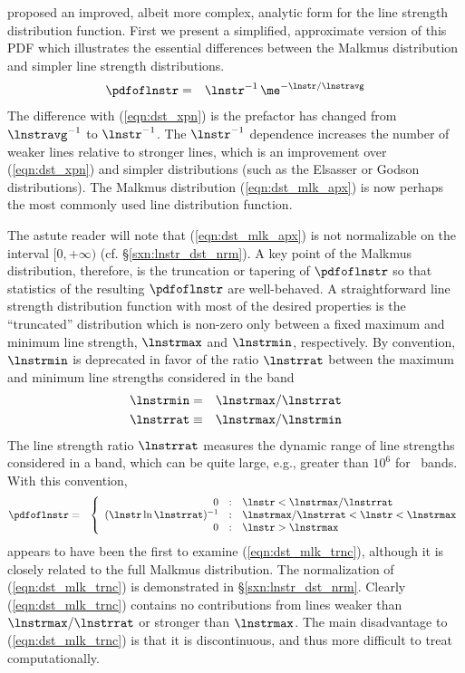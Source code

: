 \documentclass[12pt]{article}
\begin{document}
\cite{Mal67} proposed an improved, albeit more complex,
analytic form for the line strength distribution function.
First we present a simplified, approximate version of this PDF
which illustrates the essential differences between the Malkmus
distribution and simpler line strength distributions.
\begin{eqnarray}
\pdfoflnstr & = & \lnstr^{-1} \, \me^{-\lnstr/\lnstravg}
\label{eqn:dst_mlk_apx}
\end{eqnarray}
The difference with (\ref{eqn:dst_xpn}) is the prefactor has changed
from $\lnstravg^{-1}$ to $\lnstr^{-1}$.
The $\lnstr^{-1}$ dependence increases the number of weaker lines
relative to stronger lines, which is an improvement over
(\ref{eqn:dst_xpn}) and simpler distributions (such as the Elsasser or
Godson distributions). 
The Malkmus distribution (\ref{eqn:dst_mlk_apx}) is now perhaps the most
commonly used line distribution function. 

The astute reader will note that (\ref{eqn:dst_mlk_apx}) is not
normalizable on the interval $[0,+\infty)$
(cf. \S\ref{sxn:lnstr_dst_nrm}). 
A key point of the Malkmus distribution, therefore, is the
truncation or tapering of $\pdfoflnstr$ so that statistics of the
resulting $\pdfoflnstr$ are well-behaved.
A straightforward line strength distribution function with most
of the desired properties is the ``truncated'' distribution which is
non-zero only between a fixed maximum and minimum line strength, 
$\lnstrmax$ and $\lnstrmin$, respectively.
By convention, $\lnstrmin$ is deprecated in favor of the ratio
$\lnstrrat$ between the maximum and minimum line strengths considered
in the band  
\begin{eqnarray}
\lnstrmin & = & \lnstrmax / \lnstrrat \nonumber \\
\lnstrrat & \equiv & \lnstrmax / \lnstrmin
\label{eqn:lnstr_rat_dfn}
\end{eqnarray}
The line strength ratio $\lnstrrat$ measures the dynamic range of line
strengths considered in a band, which can be quite large, e.g.,
greater than $10^{6}$ for \HdO\ bands. 
With this convention, 
\begin{eqnarray}
\pdfoflnstr & = & \left\{
\begin{array}{r@{\quad:\quad}ll}
0 & \lnstr < \lnstrmax/\lnstrrat \\
(\lnstr \ln \lnstrrat)^{-1}
& \lnstrmax/\lnstrrat < \lnstr < \lnstrmax \\
0 & \lnstr > \lnstrmax \\
\end{array} \right.
\label{eqn:dst_mlk_trnc}
\end{eqnarray}
\cite{God53} appears to have been the first to examine
(\ref{eqn:dst_mlk_trnc}), although it is closely related to the full
Malkmus distribution. 
The normalization of (\ref{eqn:dst_mlk_trnc}) is demonstrated
in \S\ref{sxn:lnstr_dst_nrm}.
Clearly (\ref{eqn:dst_mlk_trnc}) contains no contributions from lines
weaker than $\lnstrmax/\lnstrrat$ or stronger than $\lnstrmax$.
The main disadvantage to (\ref{eqn:dst_mlk_trnc}) is that it is
discontinuous, and thus more difficult to treat computationally.
\end{document}

